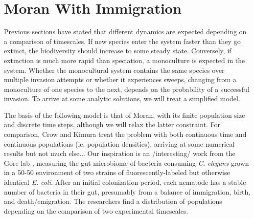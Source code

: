 \section{Moran With Immigration}
Previous sections have stated that different dynamics are expected depending on a comparison of timescales. 
If new species enter the system faster than they go extinct, the biodiversity should increase to some steady state. 
Conversely, if extinction is much more rapid than speciation, a monoculture is expected in the system. 
Whether the monocultural system contains the same species over multiple invasion attempts or whether it experiences sweeps, changing from a monoculture of one species to the next, depends on the probability of a successful invasion. 
To arrive at some analytic solutions, we will treat a simplified model. 

The basis of the following model is that of Moran, with its finite population size and discrete time steps, although we will relax the latter constraint. 
For comparison, Crow and Kimura \cite{Crow1956,Kimura1983} treat the problem with both continuous time and continuous populations (ie. population densities), arriving at some numerical results but not much else...
Our inspiration is an /interesting/ work from the Gore lab \cite{Vega2017}, measuring the gut microbiome of bacteria-consuming \emph{C. elegans} grown in a 50-50 environment of two strains of fluorescently-labeled but otherwise identical \emph{E. coli}. 
After an initial colonization period, each nematode has a stable number of bacteria in their gut, presumably from a balance of immigration, birth, and death/emigration. 
The researchers find a distribution of populations depending on the comparison of two experimental timescales. 

